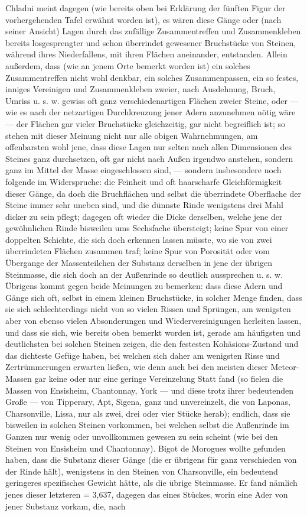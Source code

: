 \documentclass[a4paper, 11pt, oneside, german]{article}
\begin{document}
Chladni meint dagegen (wie bereits oben bei Erklärung der fünften Figur der vorhergehenden Tafel erwähnt worden ist), es wären diese Gänge oder (nach seiner Ansicht) Lagen durch das zufällige Zusammentreffen und Zusammenkleben bereits losgesprengter und schon überrindet gewesener Bruchstücke von Steinen, während ihres Niederfallens, mit ihren Flächen aneinander, entstanden. Allein außerdem, dass (wie an jenem Orte bemerkt worden ist) ein solches Zusammentreffen nicht wohl denkbar, ein solches Zusammenpassen, ein so festes, inniges Vereinigen und Zusammenkleben zweier, nach Ausdehnung, Bruch, Umriss u. s. w. gewiss oft ganz verschiedenartigen Flächen zweier Steine, oder --- wie es nach der netzartigen Durchkreuzung jener Adern anzunehmen nötig wäre --- der Flächen gar vieler Bruchstücke gleichzeitig, gar nicht begreiflich ist; so stehen mit dieser Meinung nicht nur alle obigen Wahrnehmungen, am offenbarsten wohl jene, dass diese Lagen nur selten nach allen Dimensionen des Steines ganz durchsetzen, oft gar nicht nach Außen irgendwo anstehen, sondern ganz im Mittel der Masse eingeschlossen sind, --- sondern insbesondere noch folgende im Widerspruche: die Feinheit und oft haarscharfe Gleichförmigkeit dieser Gänge, da doch die Bruchflächen und selbst die überrindete Oberflache der Steine immer sehr uneben sind, und die dünnste Rinde wenigstens drei Mahl dicker zu sein pflegt; dagegen oft wieder die Dicke derselben, welche jene der gewöhnlichen Rinde bisweilen ums Sechsfache übersteigt; keine Spur von einer doppelten Schichte, die sich doch erkennen lassen müsste, wo sie von zwei überrindeten Flächen zusammen traf; keine Spur von Porosität oder vom Übergange der Massenteilchen der Substanz derselben in jene der übrigen Steinmasse, die sich doch an der Außenrinde so deutlich aussprechen u. s. w. Übrigens kommt gegen beide Meinungen zu bemerken: dass diese Adern und Gänge sich oft, selbst in einem kleinen Bruchstücke, in solcher Menge finden, dass sie sich schlechterdings nicht von so vielen Rissen und Sprüngen, am wenigsten aber von ebenso vielen Absonderungen und Wiedervereinigungen herleiten lassen, und dass sie sich, wie bereits oben bemerkt worden ist, gerade am häufigsten und deutlichsten bei solchen Steinen zeigen, die den festesten Kohäsions-Zustand und das dichteste Gefüge haben, bei welchen sich daher am wenigsten Risse und Zertrümmerungen erwarten ließen, wie denn auch bei den meisten dieser Meteor-Massen gar keine oder nur eine geringe Vereinzelung Statt fand (so fielen die Massen von Ensisheim, Chantonnay, York --- und diese trotz ihrer bedeutenden Große --- von Tipperary, Apt, Sigena, ganz und unvereinzelt, die von Laponas, Charsonville, Lissa, nur als zwei, drei oder vier Stücke herab); endlich, dass sie bisweilen in solchen Steinen vorkommen, bei welchen selbst die Außenrinde im Ganzen nur wenig oder unvollkommen gewesen zu sein scheint (wie bei den Steinen von Ensisheim und Chantonnay). Bigot de Morogues wollte gefunden haben, dass die Substanz dieser Gänge (die er übrigens für ganz verschieden von der Rinde hält), wenigstens in den Steinen von Charsonville, ein bedeutend geringeres spezifisches Gewicht hätte, als die übrige Steinmasse. Er fand nämlich jenes dieser letzteren = 3,637, dagegen das eines Stückes, worin eine Ader von jener Substanz vorkam, die, nach 
\end{document}
